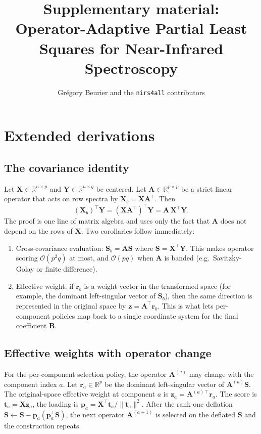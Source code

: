 \documentclass[a4paper,11pt]{article}
\title{Supplementary material:\\
Operator-Adaptive Partial Least Squares for Near-Infrared Spectroscopy}
\author{Gr\'egory Beurier and the \texttt{nirs4all} contributors}
\date{}
\newcommand{\R}{\mathbb{R}}
\newcommand{\Xmat}{\mathbf{X}}
\newcommand{\Ymat}{\mathbf{Y}}
\newcommand{\Bmat}{\mathbf{B}}
\newcommand{\Amat}{\mathbf{A}}
\newcommand{\Smat}{\mathbf{S}}
\newcommand{\zvec}{\mathbf{z}}
\newcommand{\rvec}{\mathbf{r}}
\newcommand{\tvec}{\mathbf{t}}
\newcommand{\pvec}{\mathbf{p}}
\begin{document}
\maketitle

\renewcommand{\thesection}{S\arabic{section}}

\section{Extended derivations}\label{app:math}

\subsection{The covariance identity}\label{app:identity}
Let $\Xmat\in\R^{n\times p}$ and $\Ymat\in\R^{n\times q}$ be centered.
Let $\Amat\in\R^{p\times p}$ be a strict linear operator that acts on
row spectra by $\Xmat_b=\Xmat\Amat^\top$. Then
\[
(\Xmat_b)^\top \Ymat
= (\Xmat\Amat^\top)^\top \Ymat
= \Amat\,\Xmat^\top \Ymat.
\]
The proof is one line of matrix algebra and uses only the fact that
$\Amat$ does not depend on the rows of $\Xmat$. Two corollaries follow
immediately:
\begin{enumerate}[leftmargin=2em]
  \item Cross-covariance evaluation: $\Smat_b=\Amat\Smat$ where
        $\Smat=\Xmat^\top \Ymat$. This makes operator scoring
        $\mathcal{O}(p^2 q)$ at most, and $\mathcal{O}(pq)$ when
        $\Amat$ is banded (e.g.\ Savitzky-Golay or finite difference).
  \item Effective weight: if $\rvec_b$ is a weight vector in the
        transformed space (for example, the dominant left-singular
        vector of $\Smat_b$), then the same direction is represented
        in the original space by $\zvec=\Amat^\top \rvec_b$. This is
        what lets per-component policies map back to a single
        coordinate system for the final coefficient $\Bmat$.
\end{enumerate}

\subsection{Effective weights with operator change}\label{app:effective}
For the per-component selection policy, the operator $\Amat^{(a)}$ may
change with the component index $a$. Let $\rvec_a\in\R^p$ be the
dominant left-singular vector of $\Amat^{(a)}\Smat$. The original-space
effective weight at component $a$ is $\zvec_a=\Amat^{(a)\,\top}\rvec_a$.
The score is $\tvec_a=\Xmat\zvec_a$, the loading is
$\pvec_a=\Xmat^\top\tvec_a/\|\tvec_a\|^2$. After the rank-one
deflation $\Smat\leftarrow \Smat - \pvec_a(\pvec_a^\top \Smat)$, the
next operator $\Amat^{(a+1)}$ is selected on the deflated $\Smat$ and
the construction repeats.
\end{document}
